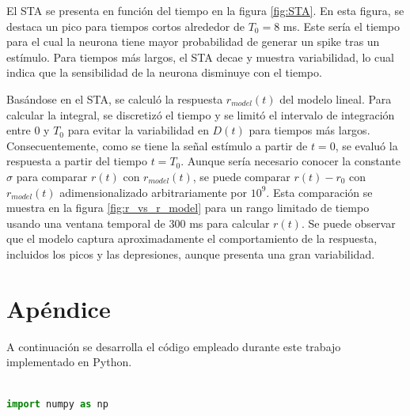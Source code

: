 \documentclass[aps,prb,twocolumn,superscriptaddress,floatfix,longbibliography]{revtex4-2}
\newcounter{para}
\begin{document}
El STA se presenta en función del tiempo en la figura \ref{fig:STA}. En esta figura, se destaca un pico para tiempos cortos alrededor de \( T_0 = 8 \) ms. Este sería el tiempo para el cual la neurona tiene mayor probabilidad de generar un spike tras un estímulo. Para tiempos más largos, el STA decae y muestra variabilidad, lo cual indica que la sensibilidad de la neurona disminuye con el tiempo.

Basándose en el STA, se calculó la respuesta  \( r_{model}(t) \) del modelo lineal. Para calcular la integral, se discretizó el tiempo y se limitó el intervalo de integración entre 0 y \( T_0 \) para evitar la variabilidad en \( D(t) \) para tiempos más largos. Consecuentemente, como se tiene la señal estímulo a partir de $t = 0$, se evaluó la respuesta a partir del tiempo \( t = T_0 \). Aunque sería necesario conocer la constante \( \sigma \) para comparar \( r(t) \) con \( r_{model}(t) \), se puede comparar \( r(t) - r_0 \) con \( r_{model}(t) \) adimensionalizado arbitrariamente por \( 10^9 \). Esta comparación se muestra en la figura \ref{fig:r_vs_r_model} para un rango limitado de tiempo usando una ventana temporal de 300 ms para calcular \( r(t) \). Se puede observar que el modelo captura aproximadamente el comportamiento de la respuesta, incluidos los picos y las depresiones, aunque presenta una gran variabilidad.



\onecolumngrid

\section{Apéndice}

A continuación se desarrolla el código empleado durante este trabajo implementado en Python.

\begin{lstlisting}[language=Python]

import numpy as np


\end{lstlisting}


\end{document}
